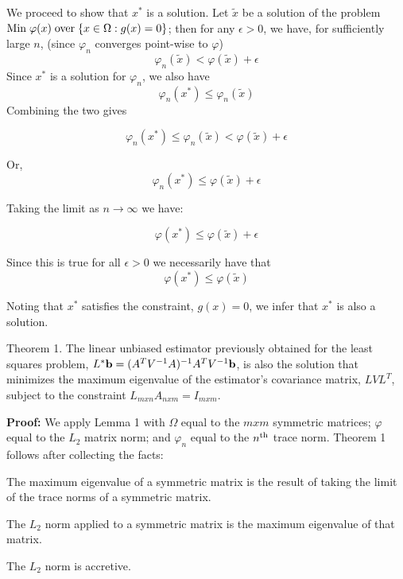 We proceed to show that $x^*$ is a solution.
Let ${\tilde x}$ be a solution of the problem 
${\rm Min}\; \varphi(x) \; {\rm over} \; \{x \in \Omega : g(x) = 0\}$;
then for any $\epsilon > 0$, we have, for sufficiently large $n$, 
(since $\varphi_n$ converges point-wise to $\varphi$)
$$
 \varphi_n({\tilde x}) < \varphi({\tilde x}) + \epsilon
$$
Since $x^*$ is a solution for $\varphi_n$, we also have
$$
\varphi_n(x^*) \le \varphi_n({\tilde x})
$$
Combining the two gives

$$
\varphi_n(x^*) \le \varphi_n({\tilde x}) < \varphi({\tilde x}) + \epsilon
$$

Or,
$$
\varphi_n(x^*) \le \varphi({\tilde x}) + \epsilon
$$

Taking the limit as $n \rightarrow \infty$ we have:

$$
\varphi(x^*) \le \varphi({\tilde x}) + \epsilon
$$

Since this is true for all $\epsilon > 0$ we necessarily have that
$$
\varphi(x^*) \le \varphi({\tilde x})
$$

Noting that $x^*$ satisfies the constraint, $g(x) = 0$, we infer that 
$x^*$ is also a solution.


\proclaim Theorem 1. The linear unbiased estimator previously obtained for the
least squares problem, $L^*{\bf b} =
(A^TV^{-1}A)^{-1}A^TV^{-1}{\bf b}$, is also the solution that
minimizes the maximum eigenvalue of the estimator's covariance matrix, 
$LVL^T$, subject to the constraint $L_{mxn}A_{nxm} = I_{mxm}$.

{\bf Proof:\/} We apply Lemma 1 with $\Omega$ equal to the $mxm$ symmetric
matrices; $\varphi$ equal to the $L_2$ matrix norm; and
$\varphi_n$ equal to the $n^{\rm th}$ trace norm. Theorem 1 follows
after collecting the facts: 

\item{The maximum eigenvalue of a symmetric matrix is the result of 
taking the limit of the trace norms of a symmetric matrix.}
\item{The $L_2$ norm applied to a symmetric matrix is the maximum
eigenvalue of that matrix.}
\item{The $L_2$ norm is accretive.}


\bye
